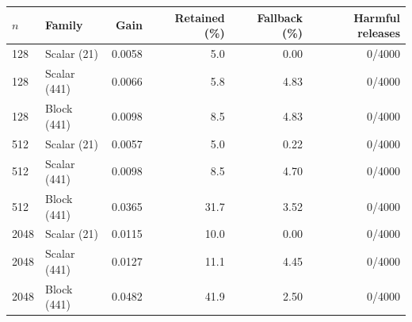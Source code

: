 \begin{tabular}{llrrrr}
\toprule
$n$ & Family & Gain & Retained (\%) & Fallback (\%) & Harmful releases \\
\midrule
128 & Scalar (21) & 0.0058 & 5.0 & 0.00 & 0/4000 \\
128 & Scalar (441) & 0.0066 & 5.8 & 4.83 & 0/4000 \\
128 & Block (441) & 0.0098 & 8.5 & 4.83 & 0/4000 \\
512 & Scalar (21) & 0.0057 & 5.0 & 0.22 & 0/4000 \\
512 & Scalar (441) & 0.0098 & 8.5 & 4.70 & 0/4000 \\
512 & Block (441) & 0.0365 & 31.7 & 3.52 & 0/4000 \\
2048 & Scalar (21) & 0.0115 & 10.0 & 0.00 & 0/4000 \\
2048 & Scalar (441) & 0.0127 & 11.1 & 4.45 & 0/4000 \\
2048 & Block (441) & 0.0482 & 41.9 & 2.50 & 0/4000 \\
\bottomrule
\end{tabular}
